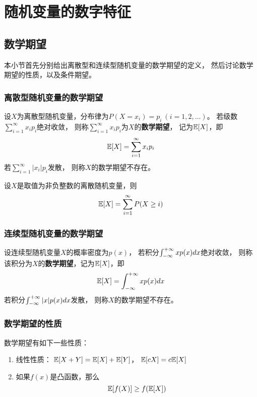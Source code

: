 \chapter{随机变量的数字特征}

\section{数学期望}
本小节首先分别给出离散型和连续型随机变量的数学期望的定义，
然后讨论数学期望的性质，以及条件期望。

\subsection{离散型随机变量的数学期望}
\begin{definition}[离散型随机变量的数学期望]
  设$X$为离散型随机变量，分布律为$P(X=x_i)=p_i\ (i=1,2,\dots)$。
  若级数$\sum_{i=1}^{\infty}x_ip_i$绝对收敛，
  则称$\sum_{i=1}^{\infty}x_ip_i$为$X$的\textbf{数学期望}，
  记为$\mathbb{E}[X]$，即
  \begin{displaymath}
    \mathbb{E}[X] = \sum_{i=1}^{\infty}x_ip_i
  \end{displaymath}
  若$\sum_{i=1}^{\infty}|x_i|p_i$发散，
  则称$X$的数学期望不存在。
\end{definition}

\begin{theorem}[离散非负随机变量的期望的其它计算方法]
  设$X$是取值为非负整数的离散随机变量，则
  \begin{displaymath}
    \mathbb{E}[X] = \sum_{i=1}^{\infty} P(X\ge i)
  \end{displaymath}
\end{theorem}

\subsection{连续型随机变量的数学期望}
\begin{definition}[连续型随机变量的数学期望]
  设连续型随机变量$X$的概率密度为$p(x)$，
  若积分$\int_{-\infty}^{+\infty} xp(x)dx$绝对收敛，
  则称该积分为$X$的\textbf{数学期望}，记为$\mathbb{E}[X]$，即
  \begin{displaymath}
    \mathbb{E}[X] = \int_{-\infty}^{+\infty} xp(x)dx
  \end{displaymath}
  若积分$\int_{-\infty}^{+\infty} |x|p(x)dx$发散，
  则称$X$的数学期望不存在。
\end{definition}

\subsection{数学期望的性质}
\begin{theorem}[数学期望的性质]
  数学期望有如下一些性质：
  \begin{enumerate}
    \item 线性性质：
    $\mathbb{E}[X+Y] = \mathbb{E}[X] + \mathbb{E}[Y]$，
    $\mathbb{E}[cX] = c\mathbb{E}[X]$
    \item
    如果$f(x)$是凸函数，那么
    \begin{displaymath}
      \mathbb{E}[f(X)] \ge f(\mathbb{E}[X])
    \end{displaymath}
  \end{enumerate}
\end{theorem}

